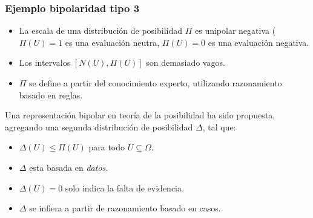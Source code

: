 \documentclass{beamer}
\theoremstyle{definition}
\begin{document}
\begin{frame}
  \frametitle{Ejemplo bipolaridad tipo 3}
  \begin{itemize}
  \item La escala de una distribución de posibilidad $\Pi$ es unipolar
    negativa ($\Pi(U) = 1$ es una evaluación neutra, $\Pi(U) = 0$ es una
    evaluación negativa.
  \item Los intervalos $[N(U), \Pi(U)]$ son demasiado vagos.
  \item $\Pi$ se define a partir del conocimiento experto, utilizando
    razonamiento basado en reglas.
  \end{itemize}

Una representación bipolar en teoría de la posibilidad ha sido
propuesta, agregando una segunda distribución de posibilidad $\Delta$,
tal que:
\begin{itemize}
\item $\Delta(U) \leq \Pi(U)$ para todo $U \subseteq \Omega$.
\item $\Delta$ esta basada en \emph{datos}.
\item $\Delta(U) = 0$ solo indica la falta de evidencia.
\item $\Delta$ se infiera a partir de razonamiento basado en casos.
\end{itemize}
\end{frame}
\end{document}
